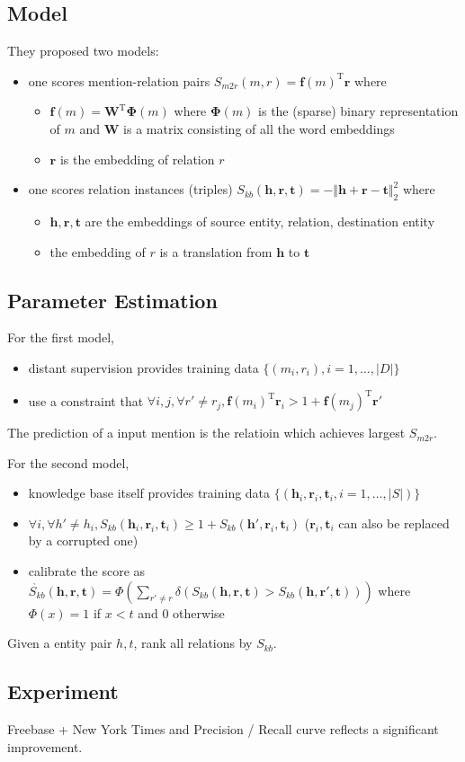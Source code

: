 \documentclass[10pt]{article} %
\theoremstyle{definition}
\theoremstyle{definition}
\begin{document}
\subsection{Model}
They proposed two models:
\begin{itemize}
\item one scores mention-relation pairs $S_{m2r}(m,r)=\mathbf{f}(m)^{\mathrm{T}}\mathbf{r}$ where 
	\begin{itemize}
	\item $\mathbf{f}(m)=\mathbf{W}^{\mathrm{T}}\boldsymbol{\Phi}(m)$ where $\boldsymbol{\Phi}(m)$ is the (sparse) binary representation of $m$ and $\mathbf{W}$ is a matrix consisting of all the word embeddings
	\item $\mathbf{r}$ is the embedding of relation $r$
	\end{itemize}
\item one scores relation instances (triples) $S_{kb}(\mathbf{h},\mathbf{r},\mathbf{t})=-\Vert\mathbf{h}+\mathbf{r}-\mathbf{t}\Vert_{2}^{2}$ where  
	\begin{itemize}
	\item $\mathbf{h},\mathbf{r},\mathbf{t}$ are the embeddings of source entity, relation, destination entity 
	\item the embedding of $r$ is a translation from $\mathbf{h}$ to $\mathbf{t}$
	\end{itemize}
\end{itemize}



\subsection{Parameter Estimation}
For the first model, 
\begin{itemize}
\item distant supervision provides training data $\{(m_i, r_i), i=1,\ldots,\vert D \vert\}$
\item use a constraint that $\forall i, j, \forall r'\neq r_j, \mathbf{f}(m_i)^{\mathrm{T}}\mathbf{r}_i > 1 + \mathbf{f}(m_j)^{\mathrm{T}}\mathbf{r}'$
\end{itemize}
The prediction of a input mention is the relatioin which achieves largest $S_{m2r}$. 



For the second model, 
\begin{itemize}
\item knowledge base itself provides training data $\{(\mathbf{h}_i, \mathbf{r}_{i}, \mathbf{t}_{i}, i=1,\ldots,|S|)\}$
\item $\forall i, \forall h'\neq h_i, S_{kb}(\mathbf{h}_i,\mathbf{r}_i,\mathbf{t}_i)\geq 1+S_{kb}(\mathbf{h}',\mathbf{r}_i,\mathbf{t}_i)$ ($\mathbf{r}_i, \mathbf{t}_i$ can also be replaced by a corrupted one)
\item calibrate the score as $\grave{S_{kb}}(\mathbf{h}, \mathbf{r}, \mathbf{t})=\Phi(\sum_{r'\neq r}\delta(S_{kb}(\mathbf{h},\mathbf{r},\mathbf{t}) > S_{kb}(\mathbf{h},\mathbf{r}',\mathbf{t})))$ where $\Phi(x)=1$ if $x<t$ and $0$ otherwise 
\end{itemize}
Given a entity pair $h,t$, rank all relations by $S_{kb}$. 


\subsection{Experiment}
Freebase + New York Times and Precision / Recall curve reflects a significant improvement. 


%
%
\end{document}
